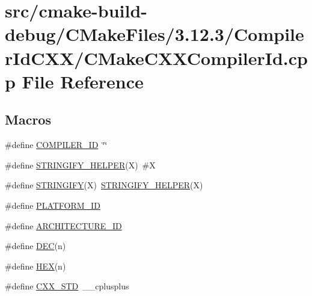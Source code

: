 \hypertarget{cmake-build-debug_2CMakeFiles_23_812_83_2CompilerIdCXX_2CMakeCXXCompilerId_8cpp}{}\section{src/cmake-\/build-\/debug/\+C\+Make\+Files/3.12.3/\+Compiler\+Id\+C\+X\+X/\+C\+Make\+C\+X\+X\+Compiler\+Id.cpp File Reference}
\label{cmake-build-debug_2CMakeFiles_23_812_83_2CompilerIdCXX_2CMakeCXXCompilerId_8cpp}
\subsection*{Macros}
\begin{DoxyCompactItemize}
\item 
\#define \hyperlink{cmake-build-debug_2CMakeFiles_23_812_83_2CompilerIdCXX_2CMakeCXXCompilerId_8cpp_a81dee0709ded976b2e0319239f72d174}{C\+O\+M\+P\+I\+L\+E\+R\+\_\+\+ID}~\char`\"{}\char`\"{}
\item 
\#define \hyperlink{cmake-build-debug_2CMakeFiles_23_812_83_2CompilerIdCXX_2CMakeCXXCompilerId_8cpp_a2ae9b72bb13abaabfcf2ee0ba7d3fa1d}{S\+T\+R\+I\+N\+G\+I\+F\+Y\+\_\+\+H\+E\+L\+P\+ER}(X)~\#X
\item 
\#define \hyperlink{cmake-build-debug_2CMakeFiles_23_812_83_2CompilerIdCXX_2CMakeCXXCompilerId_8cpp_a43e1cad902b6477bec893cb6430bd6c8}{S\+T\+R\+I\+N\+G\+I\+FY}(X)~\hyperlink{cmake-build-release_2CMakeFiles_23_812_83_2CompilerIdCXX_2CMakeCXXCompilerId_8cpp_a2ae9b72bb13abaabfcf2ee0ba7d3fa1d}{S\+T\+R\+I\+N\+G\+I\+F\+Y\+\_\+\+H\+E\+L\+P\+ER}(X)
\item 
\#define \hyperlink{cmake-build-debug_2CMakeFiles_23_812_83_2CompilerIdCXX_2CMakeCXXCompilerId_8cpp_adbc5372f40838899018fadbc89bd588b}{P\+L\+A\+T\+F\+O\+R\+M\+\_\+\+ID}
\item 
\#define \hyperlink{cmake-build-debug_2CMakeFiles_23_812_83_2CompilerIdCXX_2CMakeCXXCompilerId_8cpp_aba35d0d200deaeb06aee95ca297acb28}{A\+R\+C\+H\+I\+T\+E\+C\+T\+U\+R\+E\+\_\+\+ID}
\item 
\#define \hyperlink{cmake-build-debug_2CMakeFiles_23_812_83_2CompilerIdCXX_2CMakeCXXCompilerId_8cpp_ad1280362da42492bbc11aa78cbf776ad}{D\+EC}(n)
\item 
\#define \hyperlink{cmake-build-debug_2CMakeFiles_23_812_83_2CompilerIdCXX_2CMakeCXXCompilerId_8cpp_a46d5d95daa1bef867bd0179594310ed5}{H\+EX}(n)
\item 
\#define \hyperlink{cmake-build-debug_2CMakeFiles_23_812_83_2CompilerIdCXX_2CMakeCXXCompilerId_8cpp_a34cc889e576a1ae6c84ae9e0a851ba21}{C\+X\+X\+\_\+\+S\+TD}~\+\_\+\+\_\+cplusplus
\end{DoxyCompactItemize}
